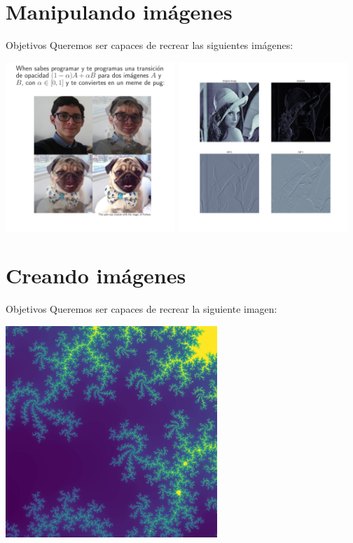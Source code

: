 \documentclass[usenames,dvipsnames]{beamer}
\begin{document}
  \section{Manipulando imágenes}
  \begin{frame}{Objetivos}
    Queremos ser capaces de recrear las siguientes imágenes:
    \begin{center}
      \includegraphics[width=0.48\textwidth]{imgs/meme}\hspace{0.1cm}
      \includegraphics[width=0.48\textwidth]{imgs/derivatives}
    \end{center}
  \end{frame}

  \section{Creando imágenes}
  \begin{frame}{Objetivos}
    Queremos ser capaces de recrear la siguiente imagen:
    \begin{center}
      \includegraphics[width=0.6\textwidth]{imgs/mandel}\hspace{0.5cm}
    \end{center}
  \end{frame}
\end{document}
